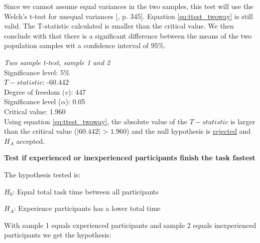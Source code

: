 \vspace{0.3cm}

Since we cannot assume equal variances in the two samples, this test will use the Welch's t-test for unequal variances [\citep{Walpole2012}, p. 345]. Equation \ref{eq:ttest_twoway} is still valid. The T-statistic calculated is smaller than the critical value. We then conclude with that there is a significant difference between the means of the two population samples wit a confidence interval of 95\%.\\[0.2cm]

 \begin{center}
	\begin{tcolorbox}[box align=center,width=\textwidth-5cm]
		\centering
		\textit{Two sample t-test, sample 1 and 2}\\
		Significance level: 5\%  \\[0.5cm]
		
		$T-statistic$: -60.442 \\
		Degree of freedom ($v$): 447 \\ %
		Significance level ($\alpha$): 0.05 \\
		Critical value: 1.960\\[0.2cm]
		
		Using equation \ref{eq:ttest_twoway}, the absolute value of the $T-statistic$ is larger than the critical value ($|60.442|$ > $1.960$) and the null hypothesis is \underline{rejected} and $H_A$ accepted.\\[0.5cm]

	\end{tcolorbox} 
\end{center}

\vspace{0.7cm}

\textbf{Test if  experienced or inexperienced participants finish the task fastest} 

The hypothesis tested is:\newline

\centerline{$H_{0}$: Equal total task time between all participants}
\centerline{$H_{A}$: Experience participants has a lower total time}

With sample 1 equals experienced participants and sample 2 equals inexperienced participants we get the hypothesis:\\[0.2cm]

